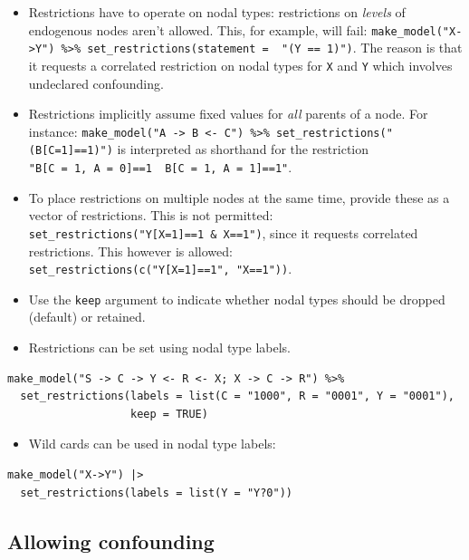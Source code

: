 \documentclass[
  article]{jss}
\providecommand{\tightlist}{%
  \setlength{\itemsep}{0pt}\setlength{\parskip}{0pt}}\usepackage{longtable,booktabs,array}
\begin{document}
\begin{itemize}
\tightlist
\item
  Restrictions have to operate on nodal types: restrictions on
  \emph{levels} of endogenous nodes aren't allowed. This, for example,
  will fail:
  \texttt{make\_model("X-\textgreater{}Y")\ \%\textgreater{}\%\ set\_restrictions(statement\ =\ \ "(Y\ ==\ 1)")}.
  The reason is that it requests a correlated restriction on nodal types
  for \texttt{X} and \texttt{Y} which involves undeclared confounding.
\item
  Restrictions implicitly assume fixed values for \emph{all} parents of
  a node. For instance:
  \texttt{make\_model("A\ -\textgreater{}\ B\ \textless{}-\ C")\ \%\textgreater{}\%\ set\_restrictions("(B{[}C=1{]}==1)")}
  is interpreted as shorthand for the restriction
  \texttt{"B{[}C\ =\ 1,\ A\ =\ 0{]}==1\ \textbar{}\ B{[}C\ =\ 1,\ A\ =\ 1{]}==1"}.
\item
  To place restrictions on multiple nodes at the same time, provide
  these as a vector of restrictions. This is not permitted:
  \texttt{set\_restrictions("Y{[}X=1{]}==1\ \&\ X==1")}, since it
  requests correlated restrictions. This however is allowed:
  \texttt{set\_restrictions(c("Y{[}X=1{]}==1",\ "X==1"))}.\\
\item
  Use the \texttt{keep} argument to indicate whether nodal types should
  be dropped (default) or retained.
\item
  Restrictions can be set using nodal type labels.
\end{itemize}

\begin{verbatim}
make_model("S -> C -> Y <- R <- X; X -> C -> R") %>%
  set_restrictions(labels = list(C = "1000", R = "0001", Y = "0001"), 
                   keep = TRUE)
\end{verbatim}

\begin{itemize}
\tightlist
\item
  Wild cards can be used in nodal type labels:
\end{itemize}

\begin{verbatim}
make_model("X->Y") |>
  set_restrictions(labels = list(Y = "Y?0"))
\end{verbatim}

\hypertarget{confounding}{%
\subsection{Allowing confounding}\label{confounding}}
\end{document}
